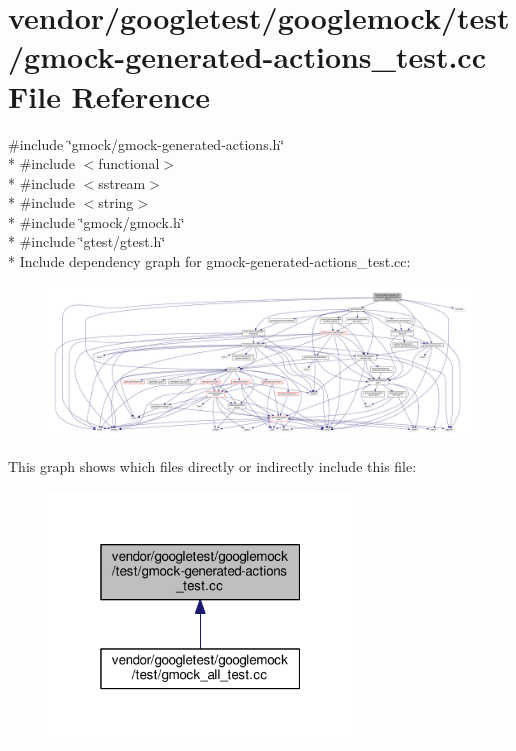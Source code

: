 \hypertarget{gmock-generated-actions__test_8cc}{}\section{vendor/googletest/googlemock/test/gmock-\/generated-\/actions\+\_\+test.cc File Reference}
\label{gmock-generated-actions__test_8cc}
{\ttfamily \#include \char`\"{}gmock/gmock-\/generated-\/actions.\+h\char`\"{}}\\*
{\ttfamily \#include $<$functional$>$}\\*
{\ttfamily \#include $<$sstream$>$}\\*
{\ttfamily \#include $<$string$>$}\\*
{\ttfamily \#include \char`\"{}gmock/gmock.\+h\char`\"{}}\\*
{\ttfamily \#include \char`\"{}gtest/gtest.\+h\char`\"{}}\\*
Include dependency graph for gmock-\/generated-\/actions\+\_\+test.cc\+:\nopagebreak
\begin{figure}[H]
\begin{center}
\leavevmode
\includegraphics[width=350pt]{gmock-generated-actions__test_8cc__incl}
\end{center}
\end{figure}
This graph shows which files directly or indirectly include this file\+:\nopagebreak
\begin{figure}[H]
\begin{center}
\leavevmode
\includegraphics[width=229pt]{gmock-generated-actions__test_8cc__dep__incl}
\end{center}
\end{figure}
